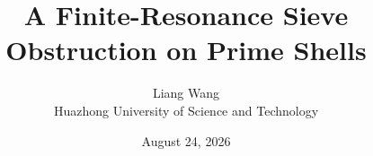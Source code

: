 \documentclass[11pt]{article}
\title{A Finite-Resonance Sieve Obstruction on Prime Shells}
\author{Liang Wang\\
Huazhong University of Science and Technology}
\date{August 24, 2026}
\begin{document}
\maketitle








{\small}
\end{document}
